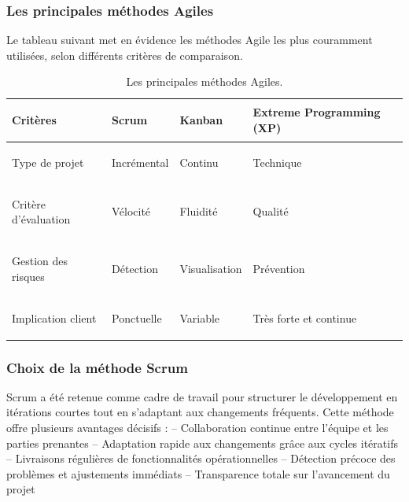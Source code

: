 \subsubsection{ Les principales méthodes Agiles}
Le tableau suivant met en évidence les méthodes Agile les plus couramment utilisées, selon différents critères de comparaison.
\begin{table}[H]
    \centering
    \renewcommand{\arraystretch}{1.6} %
    
    
    \begin{tabularx}{\textwidth}{
        | >{\bfseries\raggedright\arraybackslash}p{3.5cm} 
        | >{\centering\arraybackslash}X 
        | >{\centering\arraybackslash}X 
        | >{\centering\arraybackslash}X 
        | }
        
    \hline
    \rowcolor{blue!20} \textbf{Critères} & \textbf{Scrum} & \textbf{Kanban} & \textbf{Extreme Programming (XP)} \\
    \hline
    Type de projet & Incrémental & Continu & Technique \\
    \hline
    Critère d'évaluation & Vélocité & Fluidité & Qualité \\
    \hline
    Gestion des risques & Détection & Visualisation & Prévention \\
    \hline
    Implication client & Ponctuelle & Variable & Très forte et continue \\
    \hline
    
\end{tabularx}
    \vspace{0.2cm}
    \caption{Les principales méthodes Agiles.}
    \label{tab:methodes_agiles}
\end{table}

\subsubsection{Choix de la méthode Scrum}
Scrum a été retenue comme cadre de travail pour structurer le développement en itérations courtes tout en s'adaptant aux changements fréquents. Cette méthode offre plusieurs avantages décisifs :
\newline
\noindent
         --\hspace{0.5cm} Collaboration continue entre l'équipe et les parties prenantes
\newline --\hspace{0.5cm}  Adaptation rapide aux changements grâce aux cycles itératifs
\newline --\hspace{0.5cm} Livraisons régulières de fonctionnalités opérationnelles
\newline --\hspace{0.5cm} Détection précoce des problèmes et ajustements immédiats
\newline --\hspace{0.5cm} Transparence totale sur l'avancement du projet

